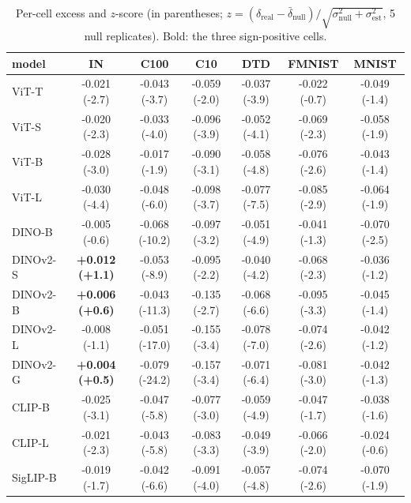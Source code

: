 \begin{table}[H]
\centering
\small
\setlength{\tabcolsep}{4pt}
\begin{tabular}{lcccccc}
\toprule
model & IN & C100 & C10 & DTD & FMNIST & MNIST \\
\midrule
ViT-T & -0.021 (-2.7) & -0.043 (-3.7) & -0.059 (-2.0) & -0.037 (-3.9) & -0.022 (-0.7) & -0.049 (-1.4) \\
ViT-S & -0.020 (-2.3) & -0.033 (-4.0) & -0.096 (-3.9) & -0.052 (-4.1) & -0.069 (-2.3) & -0.058 (-1.9) \\
ViT-B & -0.028 (-3.0) & -0.017 (-1.9) & -0.090 (-3.1) & -0.058 (-4.8) & -0.076 (-2.6) & -0.043 (-1.4) \\
ViT-L & -0.030 (-4.4) & -0.048 (-6.0) & -0.098 (-3.7) & -0.077 (-7.5) & -0.085 (-2.9) & -0.064 (-1.9) \\
DINO-B & -0.005 (-0.6) & -0.068 (-10.2) & -0.097 (-3.2) & -0.051 (-4.9) & -0.041 (-1.3) & -0.070 (-2.5) \\
DINOv2-S & \textbf{+0.012 (+1.1)} & -0.053 (-8.9) & -0.095 (-2.2) & -0.040 (-4.2) & -0.068 (-2.3) & -0.036 (-1.2) \\
DINOv2-B & \textbf{+0.006 (+0.6)} & -0.043 (-11.3) & -0.135 (-2.7) & -0.068 (-6.6) & -0.095 (-3.3) & -0.045 (-1.4) \\
DINOv2-L & -0.008 (-1.1) & -0.051 (-17.0) & -0.155 (-3.4) & -0.078 (-7.0) & -0.074 (-2.6) & -0.042 (-1.2) \\
DINOv2-G & \textbf{+0.004 (+0.5)} & -0.079 (-24.2) & -0.157 (-3.4) & -0.071 (-6.4) & -0.081 (-3.0) & -0.042 (-1.3) \\
CLIP-B & -0.025 (-3.1) & -0.047 (-5.8) & -0.077 (-3.0) & -0.059 (-4.9) & -0.047 (-1.7) & -0.038 (-1.6) \\
CLIP-L & -0.021 (-2.3) & -0.043 (-5.8) & -0.083 (-3.3) & -0.049 (-3.9) & -0.066 (-2.0) & -0.024 (-0.6) \\
SigLIP-B & -0.019 (-1.7) & -0.042 (-6.6) & -0.091 (-4.0) & -0.057 (-4.8) & -0.074 (-2.6) & -0.070 (-1.9) \\
\bottomrule
\end{tabular}
\caption{Per-cell excess and $z$-score (in parentheses; $z=(\delta_{\text{real}}-\bar\delta_{\text{null}})/\sqrt{\sigma_{\text{null}}^2+\sigma_{\text{est}}^2}$, 5 null replicates). Bold: the three sign-positive cells.}
\label{tab:b2-ztable}
\end{table}
